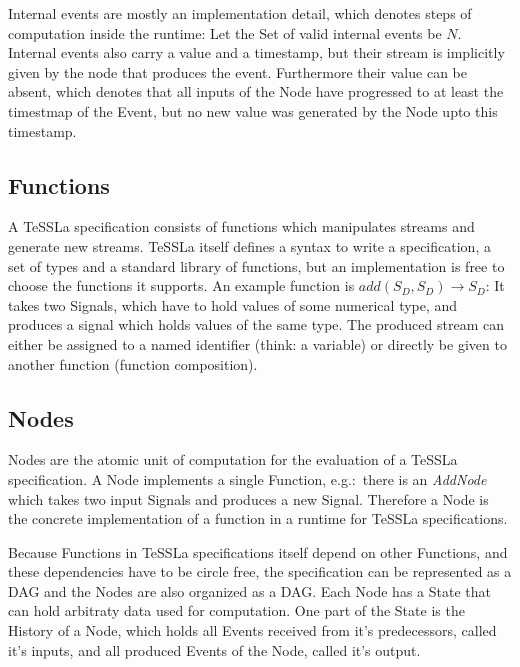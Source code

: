 Internal events are mostly an implementation detail, which denotes steps of computation inside the runtime:
Let the Set of valid internal events be \(N\).
Internal events also carry a value and a timestamp, but their stream is implicitly given by the node that produces the event.
Furthermore their value can be absent, which denotes that all inputs of the Node have progressed to at least the timestmap of the Event, but no new value was generated by the Node upto this timestamp.

\subsection{Functions}
\label{sec:concepts:defs:functions}

A TeSSLa specification consists of functions which manipulates streams and generate new streams.
TeSSLa itself defines a syntax to write a specification, a set of types and a standard library of functions, but an implementation is free to choose the functions it supports.
An example function is \(add(S_D,S_D) \rightarrow S_D\): It takes two Signals, which have to hold values of some numerical type, and produces a signal which holds values of the same type.
The produced stream can either be assigned to a named identifier (think: a variable) or directly be given to another function (function composition).

\subsection{Nodes}
\label{sec:concepts:defs:nodes}

Nodes are the atomic unit of computation for the evaluation of a TeSSLa specification.
A Node implements a single Function, e.g.:\ there is an \emph{AddNode} which takes two input Signals and produces a new Signal.
Therefore a Node is the concrete implementation of a function in a runtime for TeSSLa specifications.

Because Functions in TeSSLa specifications itself depend on other Functions, and these dependencies have to be circle free,
the specification can be represented as a DAG and the Nodes are also organized as a DAG\@.
Each Node has a State that can hold arbitraty data used for computation.
One part of the State is the History of a Node, which holds all Events received from it's predecessors, called it's inputs, and all produced Events of the Node, called it's output.

